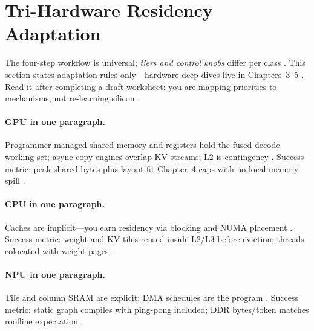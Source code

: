 \section{Tri-Hardware Residency Adaptation}
\label{sec:ch06_tri_hardware_residency}

The four-step workflow is universal; \emph{tiers and control knobs} differ per class \citep{patel2025llminference,dlbook}.
This section states adaptation rules only---hardware deep dives live in Chapters~3--5 \citep{nvidia2022hopper,amd2024xdna,amd2024aie}.
Read it after completing a draft worksheet: you are mapping priorities to mechanisms, not re-learning silicon \citep{chen2020compilerbasedhardw,yirage2026}.

\paragraph{GPU in one paragraph.}
Programmer-managed shared memory and registers hold the fused decode working set; async copy engines overlap KV streams; L2 is contingency \citep{nvidia2022hopper,semianalysis2024tma,dao2022flashattention}.
Success metric: peak shared bytes plus layout fit Chapter~4 caps with no local-memory spill \citep{memoryfloor2026,yirage2026}.

\paragraph{CPU in one paragraph.}
Caches are implicit---you earn residency via blocking and NUMA placement \citep{dlbook,rotem2018glow,patel2025llminference}.
Success metric: weight and KV tiles reused inside L2/L3 before eviction; threads colocated with weight pages \citep{kwon2023vllm,memoryfloor2026}.

\paragraph{NPU in one paragraph.}
Tile and column SRAM are explicit; DMA schedules are the program \citep{amd2024xdna,amd2024aie}.
Success metric: static graph compiles with ping-pong included; DDR bytes/token matches roofline expectation \citep{patel2025llminference,taxbreak2026}.

